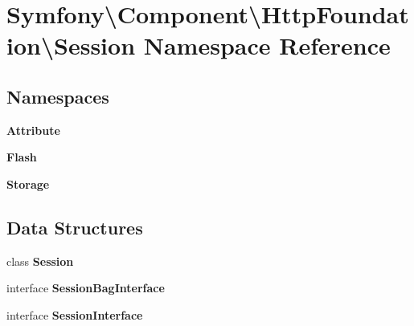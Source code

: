 \section{Symfony\textbackslash{}Component\textbackslash{}Http\+Foundation\textbackslash{}Session Namespace Reference}
\label{namespace_symfony_1_1_component_1_1_http_foundation_1_1_session}
\subsection*{Namespaces}
\begin{DoxyCompactItemize}
\item 
 {\bf Attribute}
\item 
 {\bf Flash}
\item 
 {\bf Storage}
\end{DoxyCompactItemize}
\subsection*{Data Structures}
\begin{DoxyCompactItemize}
\item 
class {\bf Session}
\item 
interface {\bf Session\+Bag\+Interface}
\item 
interface {\bf Session\+Interface}
\end{DoxyCompactItemize}
